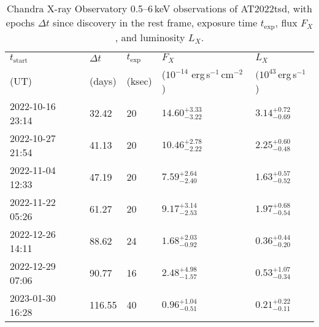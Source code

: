 \documentclass{nature_plusfigure}
\begin{document}
\begin{supplement}
\begin{table*} 
\centering 
\begin{tabular}{lllll}
\hline\hline
$t_\mathrm{start}$ & $\Delta t$ & $t_\mathrm{exp}$ & $F_X$ & $L_X$\\ 
(UT) & (days) & (ksec) & ($10^{-14}$ erg\,s$^{-1}$\,cm$^{-2}$) & $(10^{43}$\,erg\,s$^{-1}$)\\ 
\hline
2022-10-16 23:14 & 32.42 & 20 & $14.60^{+3.33}_{-3.22}$ & $3.14^{+0.72}_{-0.69}$ \\ 
2022-10-27 21:54 & 41.13 & 20 & $10.46^{+2.78}_{-2.22}$ & $2.25^{+0.60}_{-0.48}$ \\ 
2022-11-04 12:33 & 47.19 & 20 & $7.59^{+2.64}_{-2.40}$ & $1.63^{+0.57}_{-0.52}$ \\ 
2022-11-22 05:26 & 61.27 & 20 & $9.17^{+3.14}_{-2.53}$ & $1.97^{+0.68}_{-0.54}$ \\ 
2022-12-26 14:11 & 88.62 & 24 & $1.68^{+2.03}_{-0.92}$ & $0.36^{+0.44}_{-0.20}$ \\ 
2022-12-29 07:06 & 90.77 & 16 & $2.48^{+4.98}_{-1.57}$ & $0.53^{+1.07}_{-0.34}$ \\ 
2023-01-30 16:28 & 116.55 & 40 & $0.96^{+1.04}_{-0.51}$ & $0.21^{+0.22}_{-0.11}$ \\ 
\hline 
\end{tabular} 
\caption{Chandra X-ray Observatory 0.5--6\,keV observations of AT2022tsd, with epochs $\Delta t$ since discovery in the rest frame, exposure time $t_\mathrm{exp}$, flux $F_X$, and luminosity $L_X$.} 
\label{tab:chandra} 
\end{table*} 


\clearpage


\end{supplement}
\end{document}
